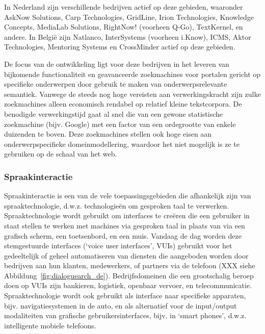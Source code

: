 \documentclass[]{../../metanetpaper}
\begin{document}
\begin{multicols}{2}
    In Nederland zijn verschillende bedrijven actief op deze gebieden, waaronder AskNow Solutions, Carp Technologies, GridLine, Irion Technologies, Knowledge Concepts, MediaLab Solutions, RightNow! (voorheen Q-Go), TextKernel, en andere. In Belgi{\"e} zijn Natlanco, InterSystems (voorheen i.Know), ICMS, Aktor Technologies, Mentoring Systems en CrossMinder actief op deze gebieden.

    De focus van de ontwikkeling ligt voor deze bedrijven in het leveren van bijkomende functionaliteit en geavanceerde zoekmachines voor portalen gericht op specifieke onderwerpen door gebruik te maken van onderwerpsrelevante semantiek. Vanwege de steeds nog hoge vereisten aan verwerkingskracht zijn zulke zoekmachines alleen economisch rendabel op relatief kleine tekstcorpora. De benodigde verwerkingstijd gaat al snel die van een gewone statistische zoekmachine (bijv. Google) met een factor van een ordegrootte van enkele duizenden te boven. Deze zoekmachines stellen ook hoge eisen aan onderwerpspecifieke domeinmodellering, waardoor het niet mogelijk is ze te gebruiken op de schaal van het web.
  
\subsubsection{Spraakinteractie}

  Spraakinteractie is een van de vele toepassingsgebieden die afhankelijk zijn van spraaktechnologie, d.w.z. technologie{\"e}n om gesproken taal te verwerken. Spraaktechnologie wordt gebruikt om interfaces te cre{\"e}ren die een gebruiker in staat stellen te werken met machines via gesproken taal in plaats van via een grafisch scherm, een toetsenbord, en een muis. Vandaag de dag worden deze stemgestuurde interfaces (`voice user interfaces', VUIs) gebruikt voor het gedeeltelijk of geheel automatiseren van diensten die aangeboden worden door bedrijven aan hun klanten, medewerkers, of partners via de telefoon (XXX siehe Abbildung~\ref{fig:dialoguearch_de}). Bedrijfsdomeinen die een grootschalig beroep doen op VUIs zijn bankieren, logistiek, openbaar vervoer, en telecommunicatie. Spraaktechnologie wordt ook gebruikt als interface naar specifieke apparaten, bijv. navigatiesystemen in de auto, en als alternatief voor de input/output modaliteiten van grafische  gebruikersinterfaces, bijv.  in `smart phones', d.w.z. intelligente mobiele telefoons.



\end{multicols}
\end{document}
